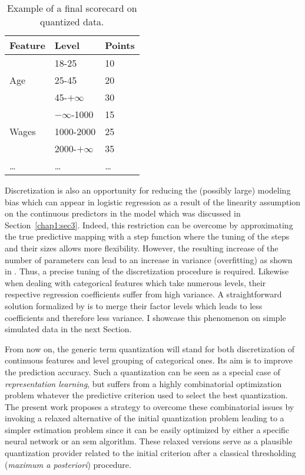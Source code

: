 \begin{table}
\centering
\caption{\label{tab:ex_scorecard} Example of a final scorecard on quantized data.}
\begin{tabular}{p{3cm}|p{3cm}|p{2cm}}
Feature & Level & Points \\
\hline
\hline
\multirow{3}{*}{Age} & 18-25 & 10 \\
 & 25-45 & 20 \\
 & 45-$+\infty$ & 30 \\
 \hline
\multirow{3}{*}{Wages} & $-\infty$-1000 & 15 \\
 & 1000-2000 & 25 \\
 & 2000-$+\infty$ & 35 \\
 \dots & \dots & \dots \\
\end{tabular}
\end{table}


Discretization is also an opportunity for reducing the (possibly large) modeling bias which can appear in logistic regression as a result of the linearity assumption on the continuous predictors in the model which was discussed in Section~\ref{chap1:sec3}. Indeed, this restriction can be overcome by approximating the true predictive mapping with a step function where the tuning of the steps and their sizes allows more flexibility. However, the resulting increase of the number of parameters can lead to an increase in variance (overfitting) as shown in \cite{yang2009discretization}. Thus, a precise tuning of the discretization procedure is required. Likewise when dealing with categorical features which take numerous levels, their respective regression coefficients suffer from high variance. A straightforward solution formalized by \cite{maj2015delete} is to merge their factor levels which leads to less coefficients and therefore less variance. I showcase this phenomenon on simple simulated data in the next Section.

From now on, the generic term quantization will stand for both discretization of continuous features and level grouping of categorical ones. Its aim is to improve the prediction accuracy. Such a quantization can be seen as a special case of \textit{representation learning}, but suffers from a highly combinatorial optimization problem whatever the predictive criterion used to select the best quantization. The present work proposes a strategy to overcome these combinatorial issues by invoking a relaxed alternative of the initial quantization problem leading to a simpler estimation problem since it can be easily optimized by either a specific neural network or an \gls{sem} algorithm. These relaxed versions serve as a plausible quantization provider related to the initial criterion after a classical thresholding (\textit{maximum a posteriori}) procedure.


